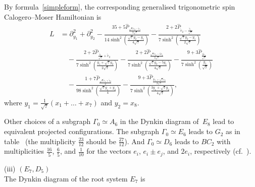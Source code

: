 \documentclass[12pt]{amsart}
\numberwithin{equation}{section}
\theoremstyle{definition}
\begin{document}
By formula~\eqref{simpleform}, the corresponding generalised trigonometric spin Calogero--Moser Hamiltonian is
\begin{align*}
    L &= \partial_{y_1}^2 + \partial_{y_2}^2 - \frac{35 + 5 \widehat{P}_{\frac{\sqrt{7}\widetilde{e}_2 - \widetilde{e}_1}{2\sqrt{7}}}}{14 \sinh^2(\frac{\sqrt{7}y_2 - y_1}{4 \sqrt{7}})} - \frac{2 + 2 \widehat{P}_{\widetilde{e}_2 - \frac{\widetilde{e}_1}{\sqrt{7}}}}{7 \sinh^2(\frac{\sqrt{7}y_2 - y_1}{2\sqrt{7}})}
    \\
    &\quad - \frac{2 + 2 \widehat{P}_{\frac{\widetilde{e}_1}{\sqrt{7}} + \widetilde{e}_2}}{7 \sinh^2(\frac{y_1+\sqrt{7} y_2}{2 \sqrt{7}})} - \frac{2 + 2\widehat{P}_{\frac{\sqrt{7}\widetilde{e}_2 - 5 \widetilde{e}_1}{2 \sqrt{7}}}}{7 \sinh^2(\frac{\sqrt{7}y_2 - 5 y_1}{4 \sqrt{7}})} - \frac{9 + 3 \widehat{P}_{\frac{2\widetilde{e}_1}{\sqrt{7}}}}{7 \sinh^2(\frac{y_1}{\sqrt{7}})}
    \\
    &\quad - \frac{1 + 7 \widehat{P}_{\frac{\sqrt{7}\widetilde{e}_1 + \widetilde{e}_2}{2}}}{98 \sinh^2(\frac{\sqrt{7}y_1 + y_2}{4})} - 
    \frac{9 + 3 \widehat{P}_{\frac{3 \widetilde{e}_1 + \sqrt{7}\widetilde{e}_2}{2 \sqrt{7}}}}{7 \sinh^2(\frac{3 y_1 + \sqrt{7}y_2}{4 \sqrt{7}})},
\end{align*}
where $y_1 = \frac{1}{\sqrt{7}}(x_1 + \dots + x_7)$ and $y_2 = x_8$.

Other choices of a subgraph $\Gamma_0 \simeq A_6$ in the Dynkin diagram of~$E_8$ lead to equivalent projected configurations.
The subgraph $\Gamma_0 \simeq E_6$ leads to $G_2$ as in table~\cite[p.~272]{Feigin} (the multiplicity $\frac{23}{12}$ should be $\frac{27}{12}$). And $\Gamma_0 \simeq D_6$ leads to $BC_2$ with multiplicities $\frac{16}{5}$, $\frac{6}{5}$, and $\frac{1}{10}$ for the vectors $e_i$, $e_i \pm e_j$, and $2e_i$, respectively (cf.~\cite[p.~272]{Feigin}).

\hfill \newline
\noindent (iii) $(E_7, D_5)$ \\
The Dynkin diagram of the root system $E_7$ is
\end{document}
